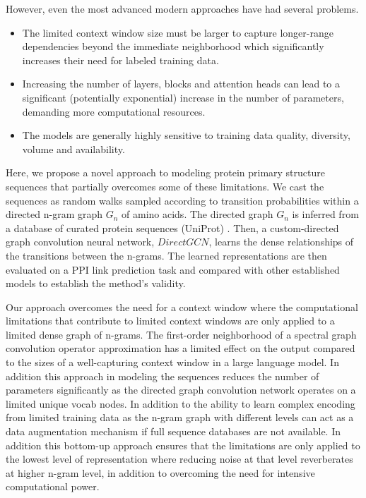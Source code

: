 \documentclass[utf8]{article}
\begin{document}
	However, even the most advanced modern approaches have had several problems.
	\begin{itemize}
		\item The limited context window size must be larger to capture longer-range dependencies beyond the immediate neighborhood which significantly increases their need for labeled training data.
		\item Increasing the number of layers, blocks and attention heads can lead to a significant (potentially exponential) increase in the number of parameters, demanding more computational resources.
		\item The models are generally highly sensitive to training data quality, diversity, volume and availability.
	\end{itemize}
	
	Here, we propose a novel approach to modeling protein primary structure sequences that partially overcomes some of these limitations. We cast the sequences as random walks sampled according to transition probabilities within a directed n-gram graph $G_{n}$ of amino acids. The directed graph $G_{n}$ is inferred from a database of curated protein sequences (UniProt) \cite{theuniprotconsortium_uniprotuniversalprotein_2023}. Then, a custom-directed graph convolution neural network, $DirectGCN$, learns the dense relationships of the transitions between the n-grams. The learned representations are then evaluated on a PPI link prediction task and compared with other established models to establish the method's validity. 
	
	Our approach overcomes the need for a context window \cite{elnaggar_prottransunderstandinglanguage_2022} where the computational limitations that contribute to limited context windows are only applied to a limited dense graph of n-grams. The first-order neighborhood of a spectral graph convolution operator approximation \cite{kipf_semisupervisedclassificationgraph_2017} has a limited effect on the output compared to the sizes of a well-capturing context window in a large language model. In addition this approach in modeling the sequences reduces the number of parameters significantly as the directed graph convolution network operates on a limited unique vocab nodes. In addition to the ability to learn complex encoding from limited training data as the n-gram graph with different levels can act as a data augmentation mechanism if full sequence databases are not available. In addition this bottom-up approach ensures that the limitations are only applied to the lowest level of representation where reducing noise at that level reverberates at higher n-gram level, in addition to overcoming the need for intensive computational power.
	
\end{document}
